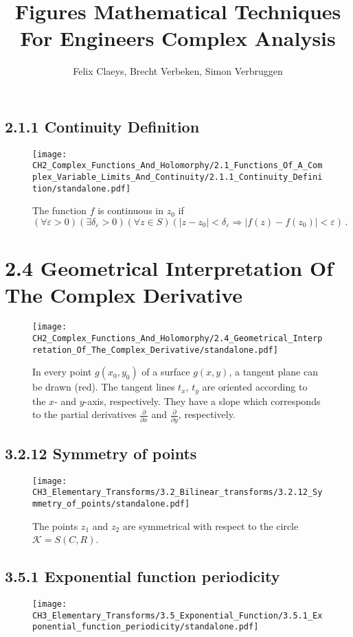 \documentclass{book}
\title{Figures Mathematical Techniques For Engineers Complex Analysis}
\author{Felix Claeys, Brecht Verbeken, Simon Verbruggen}
\begin{document}
\maketitle
\subsection*{2.1.1 Continuity Definition}
\begin{figure}[H]
\centering
\texttt{[image: CH2\_Complex\_Functions\_And\_Holomorphy/2.1\_Functions\_Of\_A\_Complex\_Variable\_Limits\_And\_Continuity/2.1.1\_Continuity\_Definition/standalone.pdf]}
\caption{The function $f$ is continuous in $z_0$ if \[( \forall \varepsilon > 0)(\exists \delta_\varepsilon > 0)(\forall z \in S)(|z-z_0|<\delta_\varepsilon \Longrightarrow |f(z) - f(z_0)|<\varepsilon)\, . \]}
\end{figure}

\section*{2.4 Geometrical Interpretation Of The Complex Derivative}
\begin{figure}[H]
\centering
\texttt{[image: CH2\_Complex\_Functions\_And\_Holomorphy/2.4\_Geometrical\_Interpretation\_Of\_The\_Complex\_Derivative/standalone.pdf]}
\caption{In every point  $g(x_0, y_0)$ of a surface $g(x,y)$, a tangent plane can be drawn (red). The tangent lines $t_x$, $t_y$ are oriented according to the $x$- and $y$-axis, respectively. They have a slope which corresponds to the partial derivatives $\frac{\partial}{\partial x}$ and $\frac{\partial}{\partial y}$, respectively.}
\end{figure}

\subsection*{3.2.12 Symmetry of points}
\begin{figure}[H]
\centering
\texttt{[image: CH3\_Elementary\_Transforms/3.2\_Bilinear\_transforms/3.2.12\_Symmetry\_of\_points/standalone.pdf]}
\caption{The points $z_1$ and $z_2$ are symmetrical with respect to the circle $\mathcal{K} = S(C,R)$.}
\end{figure}

\subsection*{3.5.1 Exponential function periodicity}
\begin{figure}[H]
\centering
\texttt{[image: CH3\_Elementary\_Transforms/3.5\_Exponential\_Function/3.5.1\_Exponential\_function\_periodicity/standalone.pdf]}
\caption{}
\end{figure}
\end{document}
